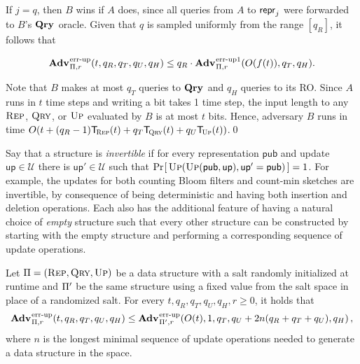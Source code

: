 If $j = q$, then $B$ wins if $A$ does, since all queries from $A$ to $\mathsf{repr}_j$ were forwarded to $B$'s $\mathbf{Qry}\hspace{0.5pt}$ oracle. Given that $q$ is sampled uniformly from the range $[q_R]$, it follows that

$$\Adv{\errep}_{\struct,r}(t, q_R, q_T, q_U, q_H) \leq q_R\cdot\Adv{\errep1}_{\struct,r}(O(f(t)), q_T, q_H).$$

Note that $B$ makes at most $q_T$ queries to $\mathbf{Qry}\hspace{0.5pt}$ and $q_H$ queries to its RO. Since $A$ runs in $t$ time steps and writing a bit takes 1 time step, the input length to any $\textsc{Rep}$, $\textsc{Qry}$, or $\textsc{Up}$ evaluated by $B$ is at most $t$ bits. Hence, adversary $B$ runs in time $O(t+(q_R-1)\ticks(\Rep,t)+q_T\ticks(\Qry,t)+q_U\ticks(\Up,t))$.\hfill\qed

Say that a structure is {\em invertible} if for every representation $\mathsf{pub}$ and update $\mathsf{up} \in \mathcal{U}$ there is $\mathsf{up}' \in \mathcal{U}$ such that $\Pr\hspace{-1pt}\left[\,\textsc{Up}(\textsc{Up}(\mathsf{pub},\mathsf{up}),\mathsf{up}' = \mathsf{pub})\,\right] = 1$.  For example, the updates for both counting Bloom filters and count-min sketches are invertible, by consequence of being deterministic and having both insertion and deletion operations. Each also has the additional feature of having a natural choice of {\em empty} structure such that every other structure can be constructed by starting with the empty structure and performing a corresponding sequence of update operations.

\begin{lemma}\label{lemma:nosalt}
  Let $\mathrm{\Pi} = (\textsc{Rep}, \textsc{Qry}, \textsc{Up})$ be a data structure with a salt randomly initialized at runtime and $\mathrm{\Pi}'$ be the same structure using a fixed value from the salt space in place of a randomized salt. For every $t, q_R, q_T, q_U, q_H, r\geq 0$, it holds that
  \[
    \Adv{\errep}_{\struct,r}(t, q_R, q_T, q_U, q_H) \leq
    \Adv{\errep}_{\struct',r}(O(t), 1, q_T, q_U+2n(q_R+q_T+q_U), q_H) \,,
  \]
  where $n$ is the longest minimal sequence of update operations needed to generate a data structure in the space.
\end{lemma}


